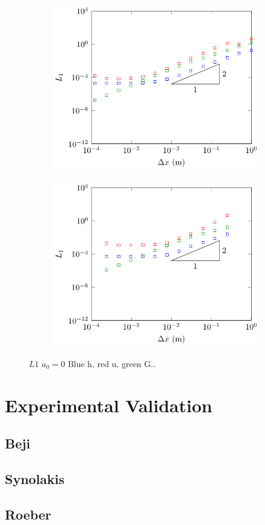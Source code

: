 \begin{figure}
	\centering
	\begin{subfigure}{0.5\textwidth}
		\includegraphics[width=\textwidth]{./chp5/figures/Forced/Dry/FDVM2.pdf}
	\end{subfigure}%
	\begin{subfigure}{0.5\textwidth}
		\includegraphics[width=\textwidth]{./chp5/figures/Forced/Dry/FEVM2.pdf}
	\end{subfigure}
\caption{$L1$ $a_0 = 0$ Blue h, red u, green G..}
\label{fig:TravGaussDryL1All}
\end{figure}


\section{Experimental Validation}

\subsection{Beji}

\subsection{Synolakis}

\subsection{Roeber}

